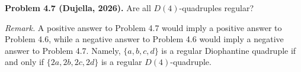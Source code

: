 \textbf{Problem 4.7 (Dujella, 2026).} Are all $D(4)$-quadruples regular?

\medskip

\textit{Remark.} A positive answer to Problem 4.7 would imply a positive answer to Problem 4.6, while a negative answer to Problem 4.6 would imply a negative answer to Problem 4.7. Namely, $\{a,b,c,d\}$ is a regular Diophantine quadruple if and only if $\{2a,2b,2c,2d\}$ is a regular $D(4)$-quadruple.
